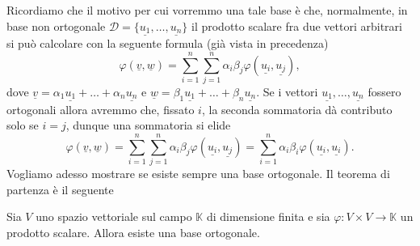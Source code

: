 Ricordiamo che il motivo per cui vorremmo una tale base è che, normalmente, in base non ortogonale $\mathcal{D} = \{ \underline{u_1}, \ldots, \underline{u_n} \}$ il prodotto scalare fra due vettori arbitrari si può calcolare con la seguente formula (già vista in precedenza)
$$
	\varphi(\underline{v}, \underline{w}) = \sum_{i=1}^n \sum_{j=1}^n \alpha_i \beta_j \varphi(\underline{u_i}, \underline{u_j}),
$$
dove $\underline{v} = \alpha_1 \underline{u_1} + \ldots + \alpha_n \underline{u_n}$ e $\underline{w} = \beta_1 \underline{u_1} + \ldots + \beta_n \underline{u_n}$. Se i vettori $\underline{u_1}, \ldots, \underline{u_n}$ fossero ortogonali allora avremmo che, fissato $i$, la seconda sommatoria dà contributo solo se $i = j$, dunque una sommatoria si elide
$$
	\varphi(\underline{v}, \underline{w}) = \sum_{i=1}^n \sum_{j=1}^n \alpha_i \beta_j \varphi(\underline{u_i}, \underline{u_j}) = \sum_{i=1}^n \alpha_i \beta_i \varphi(\underline{u_i}, \underline{u_i}).
$$
Vogliamo adesso mostrare se esiste sempre una base ortogonale. Il teorema di partenza è il seguente
\begin{theorem}[di Lagrange]
	Sia $V$ uno spazio vettoriale sul campo $\mathbb{K}$ di dimensione finita e sia $\varphi: V \times V \to \mathbb{K}$ un prodotto scalare. Allora esiste una base ortogonale.
\end{theorem} 
